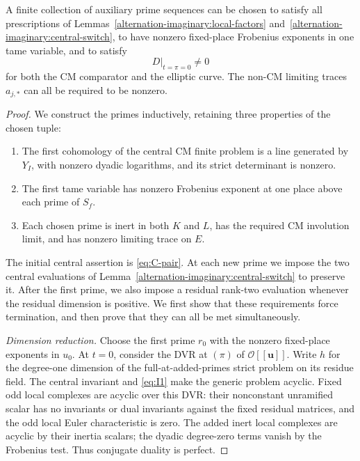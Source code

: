 \begin{proposition}\label{alternation-imaginary:concentration}
A finite collection of auxiliary prime sequences can be chosen to satisfy all prescriptions of Lemmas~\ref{alternation-imaginary:local-factors} and~\ref{alternation-imaginary:central-switch}, to have nonzero fixed-place Frobenius exponents in one tame variable, and to satisfy
\[
 D\big|_{t=\pi=0}\ne0
\]
for both the CM comparator and the elliptic curve. The non-CM limiting traces \(a_{j,*}\) can all be required to be nonzero.
\end{proposition}
\begin{proof}
We construct the primes inductively, retaining three properties of the
chosen tuple:
\begin{enumerate}[label=\textup{(\roman*)}]
\item The first cohomology of the central CM finite problem is a line
generated by \(Y_I\), with nonzero dyadic logarithms, and its strict
determinant is nonzero.
\item The first tame variable has nonzero Frobenius exponent at one
place above each prime of \(S_f\).
\item Each chosen prime is inert in both \(K\) and \(L\), has the
required CM involution limit, and has nonzero limiting trace on \(E\).
\end{enumerate}
The initial central assertion is \eqref{eq:C-pair}. At each new prime
we impose the two central evaluations of
Lemma~\ref{alternation-imaginary:central-switch} to preserve it. After
the first prime, we also impose a residual rank-two evaluation whenever
the residual dimension is positive. We first show that these requirements
force termination, and then prove that they can all be met simultaneously.

\emph{Dimension reduction.} Choose the first prime \(r_0\) with the
nonzero fixed-place exponents in \(u_0\). At \(t=0\), consider the DVR
at \((\pi)\) of \(\mathcal O[[\mathbf u]]\). Write \(h\) for the
degree-one dimension of the full-at-added-primes strict problem on its
residue field. The central invariant and \eqref{eq:I1} make the generic
problem acyclic. Fixed odd local complexes are acyclic over this DVR:
their nonconstant unramified scalar has no invariants or dual invariants
against the fixed residual matrices, and the odd local Euler
characteristic is zero. The added inert local complexes are acyclic by
their inertia scalars; the dyadic degree-zero terms vanish by the
Frobenius test. Thus conjugate duality is perfect.


\end{proof}
